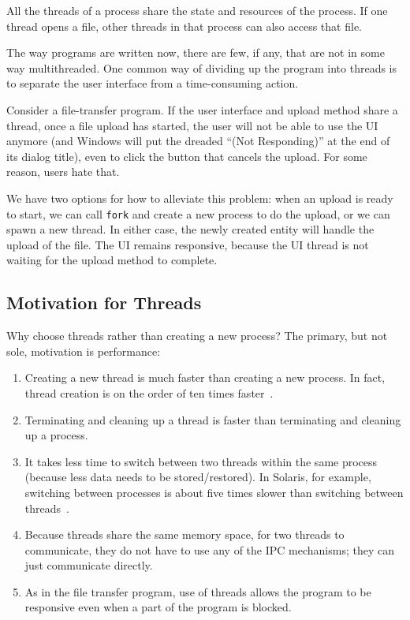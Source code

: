 All the threads of a process share the state and resources of the process. If one thread opens a file, other threads in that process can also access that file.

The way programs are written now, there are few, if any, that are not in some way multithreaded. One common way of dividing up the program into threads is to separate the user interface from a time-consuming action.

Consider a file-transfer program. If the user interface and upload method share a thread, once a file upload has started, the user will not be able to use the UI anymore (and Windows will put the dreaded ``(Not Responding)'' at the end of its dialog title), even to click the button that cancels the upload. For some reason, users hate that. 

We have two options for how to alleviate this problem: when an upload is ready to start, we can call \texttt{fork} and create a new process to do the upload, or we can spawn a new thread. In either case, the newly created entity will handle the upload of the file. The UI remains responsive, because the UI thread is not waiting for the upload method to complete.

\subsection*{Motivation for Threads}

Why choose threads rather than creating a new process? The primary, but not sole, motivation is performance:
\begin{enumerate}
	\item Creating a new thread is much faster than creating a new process. In fact, thread creation is on the order of ten times faster~\cite{machThreads}.
	\item Terminating and cleaning up a thread is faster than terminating and cleaning up a process.
	\item It takes less time to switch between two threads within the same process (because less data needs to be stored/restored). In Solaris, for example, switching between processes is about five times slower than switching between threads~\cite{osc}.
	\item Because threads share the same memory space, for two threads to communicate, they do not have to use any of the IPC mechanisms; they can just communicate directly.
	\item As in the file transfer program, use of threads allows the program to be responsive even when a part of the program is blocked.
\end{enumerate}

